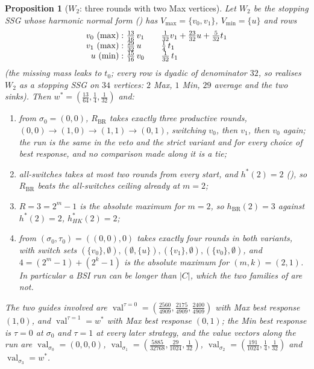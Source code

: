 \documentclass[11pt]{article}
\theoremstyle{plain}
\newtheorem{proposition}[theorem]{Proposition}
\theoremstyle{definition}
\DeclareMathOperator{\val}{val}
\newcommand{\Vmax}{V_{\max}}
\newcommand{\Vmin}{V_{\min}}
\begin{document}
\begin{proposition}[$W_2$: three rounds with two Max vertices]\label{prop:w2}
Let $W_2$ be the stopping SSG whose harmonic normal form
() has $\Vmax=\{v_0,v_1\}$, $\Vmin=\{u\}$ and rows
\[
\begin{array}{r@{\ }l@{\qquad}l}
 v_0\ (\max): & \tfrac{13}{16}\,v_1 & \tfrac1{32}v_1+\tfrac{23}{32}u+\tfrac5{32}t_1\\
 v_1\ (\max): & \tfrac{29}{32}\,u   & \tfrac14\,t_1\\
 u\ (\min):   & \tfrac{15}{16}\,v_0 & \tfrac1{32}\,t_1
\end{array}
\]
(the missing mass leaks to $t_0$; every row is dyadic of denominator $32$, so
 realises $W_2$ as a stopping SSG on $34$ vertices: $2$
Max, $1$ Min, $29$ average and the two sinks).  Then
$w^{\ast}=(\tfrac{13}{64},\tfrac14,\tfrac1{32})$ and:
\begin{enumerate}
\item[(i)] from $\sigma_0=(0,0)$, $R_{\mathrm{BR}}$ takes exactly three
 productive rounds, $(0,0)\to(1,0)\to(1,1)\to(0,1)$, switching $v_0$, then
 $v_1$, then $v_0$ again; the run is the same in the veto and the strict
 variant and for \emph{every} choice of best response, and no comparison made
 along it is a tie;
\item[(ii)] all-switches takes at most two rounds from every start, and
 $h^{\ast}(2)=2$ (), so $R_{\mathrm{BR}}$ beats the
 all-switches ceiling already at $m=2$;
\item[(iii)] $R=3=2^{m}-1$ is the absolute maximum for $m=2$, so
 $h_{\mathrm{BR}}(2)=3$ against $h^{\ast}(2)=2$, $h^{\ast}_{HK}(2)=2$;
\item[(iv)]  from $(\sigma_0,\tau_0)=((0,0),0)$ takes exactly
 four rounds in both variants, with switch sets
 $(\{v_0\},\emptyset),(\emptyset,\{u\}),(\{v_1\},\emptyset),(\{v_0\},\emptyset)$,
 and $4=(2^{m}-1)+(2^{k}-1)$ is the absolute maximum for $(m,k)=(2,1)$.  In
 particular a BSI run can be longer than $|C|$, which the two families of
  are not.
\end{enumerate}
The two guides involved are
$\val^{\tau=0}=(\tfrac{2560}{4909},\tfrac{2175}{4909},\tfrac{2400}{4909})$ with
Max best response $(1,0)$, and $\val^{\tau=1}=w^{\ast}$ with Max best response
$(0,1)$; the Min best response is $\tau=0$ at $\sigma_0$ and $\tau=1$ at every
later strategy, and the value vectors along the run are
$\val_{\sigma_0}=(0,0,0)$,
$\val_{\sigma_1}=(\tfrac{5885}{32768},\tfrac{29}{1024},\tfrac1{32})$,
$\val_{\sigma_2}=(\tfrac{191}{1024},\tfrac14,\tfrac1{32})$ and
$\val_{\sigma_3}=w^{\ast}$.
\end{proposition}
\end{document}
